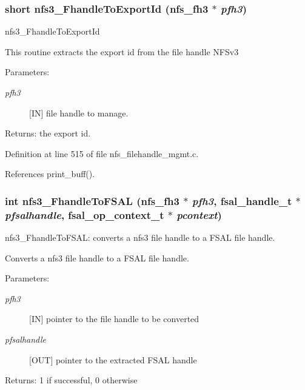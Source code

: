 \subsubsection{\setlength{\rightskip}{0pt plus 5cm}short nfs3\_\-Fhandle\-To\-Export\-Id (nfs\_\-fh3 $\ast$ {\em pfh3})}\label{nfs__filehandle__mgmt_8c_a9}


nfs3\_\-Fhandle\-To\-Export\-Id

This routine extracts the export id from the file handle NFSv3

\begin{Desc}
\item[Parameters:]
\begin{description}
\item[{\em pfh3}][IN] file handle to manage.\end{description}
\end{Desc}
\begin{Desc}
\item[Returns:]the export id. \end{Desc}


Definition at line 515 of file nfs\_\-filehandle\_\-mgmt.c.

References print\_\-buff().
\subsubsection{\setlength{\rightskip}{0pt plus 5cm}int nfs3\_\-Fhandle\-To\-FSAL (nfs\_\-fh3 $\ast$ {\em pfh3}, fsal\_\-handle\_\-t $\ast$ {\em pfsalhandle}, fsal\_\-op\_\-context\_\-t $\ast$ {\em pcontext})}\label{nfs__filehandle__mgmt_8c_a3}


nfs3\_\-Fhandle\-To\-FSAL: converts a nfs3 file handle to a FSAL file handle.

Converts a nfs3 file handle to a FSAL file handle.

\begin{Desc}
\item[Parameters:]
\begin{description}
\item[{\em pfh3}][IN] pointer to the file handle to be converted \item[{\em pfsalhandle}][OUT] pointer to the extracted FSAL handle\end{description}
\end{Desc}
\begin{Desc}
\item[Returns:]1 if successful, 0 otherwise \end{Desc}


